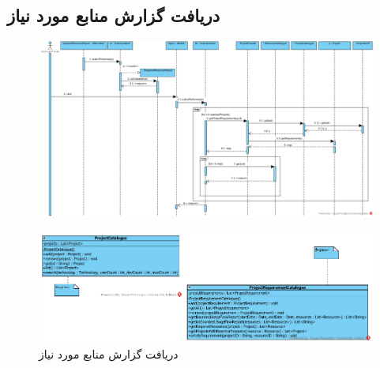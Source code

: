 \begin{landscape}
\section{دریافت گزارش منابع مورد نیاز}
\begin{figure}[H]
	\centering
	\includegraphics[scale=0.6]{img/sequence-design/RequiredResourcesReport}
\end{figure}
\begin{figure}[H]
	\centering
	\includegraphics[scale=0.7]{img/sequence-design/RequiredResourcesReportC}
	\caption{دریافت گزارش منابع مورد نیاز}
\end{figure}


\end{landscape}
